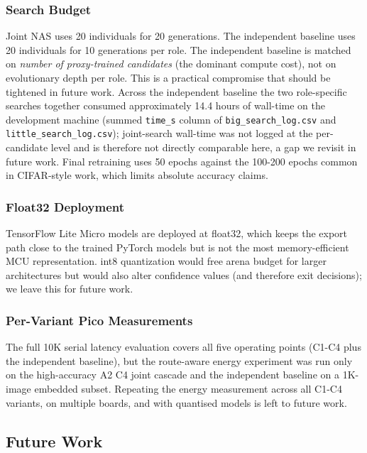 \documentclass[conference]{IEEEtran}
\begin{document}
\subsubsection{Search Budget}
Joint NAS uses 20 individuals for 20 generations. The independent
baseline uses 20 individuals for 10 generations per role. The independent baseline
is matched on \emph{number of proxy-trained candidates} (the dominant
compute cost), not on evolutionary depth per role. This is a practical
compromise that should be tightened in future work. Across the independent baseline
the two role-specific searches together consumed approximately 14.4 hours
of wall-time on the development machine (summed
\texttt{time\_s} column of \texttt{big\_search\_log.csv} and
\texttt{little\_search\_log.csv}); joint-search wall-time was not logged at
the per-candidate level and is therefore not directly comparable here, a
gap we revisit in future work. Final retraining uses 50 epochs against the
100-200 epochs common in CIFAR-style work, which limits absolute accuracy
claims.

\subsubsection{Float32 Deployment}
TensorFlow Lite Micro models are deployed at float32, which keeps the
export path close to the trained PyTorch models but is not the most
memory-efficient MCU representation. int8 quantization would free arena
budget for larger architectures but would also alter confidence values
(and therefore exit decisions); we leave this for future work.

\subsubsection{Per-Variant Pico Measurements}
The full 10K serial latency evaluation covers all five operating points
(C1-C4 plus the independent baseline), but the route-aware energy
experiment was run only on the high-accuracy A2 C4 joint cascade and the
independent baseline on a 1K-image embedded subset. Repeating the energy
measurement across all C1-C4 variants, on multiple boards, and with
quantised models is left to future work.

\subsection{Future Work}
\label{sec:future-work}
\end{document}
